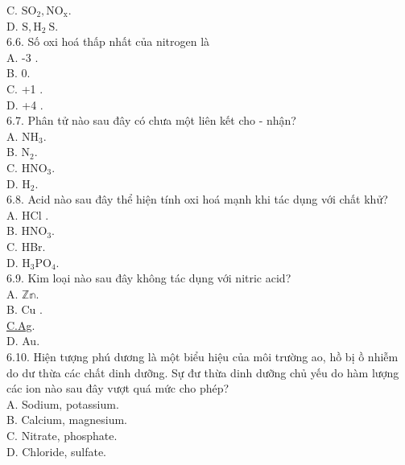 \documentclass[10pt]{article}
\begin{document}
\begin{enumerate}
\begin{enumerate}
C. $\mathrm{SO}_{2}, \mathrm{NO}_{\mathrm{x}}$.\\
D. $\mathrm{S}, \mathrm{H}_{2} \mathrm{~S}$.\\
6.6. Số oxi hoá thấp nhất của nitrogen là\\
A. -3 .\\
B. 0.\\
C. +1 .\\
D. +4 .\\
6.7. Phân tử nào sau đây có chưa một liên kết cho - nhận?\\
A. $\mathrm{NH}_{3}$.\\
B. $\mathrm{N}_{2}$.\\
C. $\mathrm{HNO}_{3}$.\\
D. $\mathrm{H}_{2}$.\\
6.8. Acid nào sau đây thể hiện tính oxi hoá mạnh khi tác dụng với chất khử?\\
A. HCl .\\
B. $\mathrm{HNO}_{3}$.\\
C. HBr.\\
D. $\mathrm{H}_{3} \mathrm{PO}_{4}$.\\
6.9. Kim loại nào sau đây không tác dụng với nitric acid?\\
A. $\mathbb{Z n}$.\\
B. Cu .\\
\href{http://C.Ag}{C.Ag}.\\
D. Au.\\
6.10. Hiện tượng phú dương là một biểu hiệu của môi trường ao, hồ bị ồ nhiễm do dư thừa các chất dinh dưỡng. Sự đư thừa dinh dưỡng chủ yếu do hàm lượng các ion nào sau đây vượt quá mức cho phép?\\
A. Sodium, potassium.\\
B. Calcium, magnesium.\\
C. Nitrate, phosphate.\\
D. Chloride, sulfate.
  \end{enumerate}
\end{enumerate}
\end{document}
